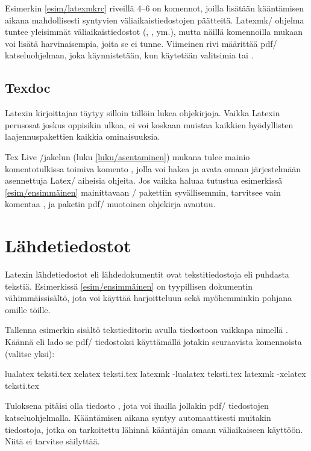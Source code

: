 Esimerkin \ref{esim/latexmkrc} riveillä 4--6 on komennot, joilla
lisätään kääntämisen aikana mahdollisesti syntyvien
väliaikaistiedostojen päätteitä. Latexmk\-/ ohjelma tuntee yleisimmät
väliaikaistiedostot (, ,  ym.), mutta
näillä komennoilla mukaan voi lisätä harvinaisempia, joita se ei tunne.
Viimeinen rivi määrittää pdf\-/ katseluohjelman, joka käynnistetään, kun
käytetään valitsimia  tai .

\subsection{Texdoc}

Latexin kirjoittajan täytyy silloin tällöin lukea ohjekirjoja. Vaikka
Latexin perusosat joskus oppisikin ulkoa, ei voi koskaan muistaa
kaikkien hyödyllisten laajennuspakettien kaikkia ominaisuuksia.

Tex Live \=/jakelun (luku \ref{luku/asentaminen}) mukana tulee mainio
komentotulkissa toimiva komento , jolla voi hakea ja avata
omaan järjestelmään asennettuja Latex\-/ aiheisia ohjeita. Jos vaikka
haluaa tutustua esimerkissä \ref{esim/ensimmäinen} mainittavaan
\-/ pakettiin syvällisemmin, tarvitsee vain komentaa
, ja paketin pdf\-/ muotoinen ohjekirja avautuu.

\section{Lähdetiedostot}
\label{luku/lähdetiedosto}

Latexin lähdetiedostot eli lähdedokumentit ovat tekstitiedostoja eli
puhdasta tekstiä. Esimerkissä \ref{esim/ensimmäinen} on tyypillisen
dokumentin vähimmäissisältö, jota voi käyttää harjoitteluun sekä
myöhemminkin pohjana omille töille.

Tallenna esimerkin sisältö tekstieditorin avulla tiedostoon vaikkapa
nimellä . Käännä eli lado se pdf\-/ tiedostoksi
käyttämällä jotakin seuraavista komennoista (valitse yksi):

\begin{koodilohkosis}
lualatex teksti.tex
xelatex  teksti.tex
latexmk -lualatex teksti.tex
latexmk -xelatex  teksti.tex
\end{koodilohkosis}

\noindent
Tuloksena pitäisi olla tiedosto , jota voi
ihailla jollakin pdf\-/ tiedostojen katseluohjelmalla. Kääntämisen
aikana syntyy automaattisesti muitakin tiedostoja, jotka on tarkoitettu
lähinnä kääntäjän omaan väliaikaiseen käyttöön. Niitä ei tarvitse
säilyttää.

